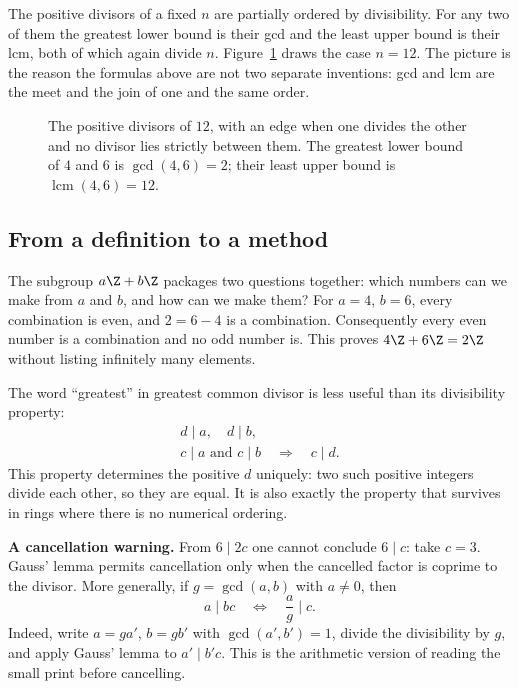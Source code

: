 The positive divisors of a fixed $n$ are partially ordered by divisibility. For any two of them the greatest lower bound is their gcd and the least upper bound is their lcm, both of which again divide $n$. Figure~\ref{fig:divisor-lattice} draws the case $n=12$. The picture is the reason the formulas above are not two separate inventions: gcd and lcm are the meet and the join of one and the same order.

\begin{figure}[ht]
\centering
{}
\caption{The positive divisors of $12$, with an edge when one divides the other and no divisor lies strictly between them. The greatest lower bound of $4$ and $6$ is $\gcd(4,6)=2$; their least upper bound is $\operatorname{lcm}(4,6)=12$.}
\label{fig:divisor-lattice}
\end{figure}

\subsection*{From a definition to a method}
The subgroup $a\Z+b\Z$ packages two questions together: which numbers can we make from $a$ and $b$, and how can we make them? For $a=4$, $b=6$, every combination is even, and $2=6-4$ is a combination. Consequently every even number is a combination and no odd number is. This proves $4\Z+6\Z=2\Z$ without listing infinitely many elements.

The word ``greatest'' in greatest common divisor is less useful than its divisibility property:
\[
\begin{gathered}
d\mid a,\quad d\mid b,\\
c\mid a\text{ and }c\mid b\quad\Longrightarrow\quad c\mid d.
\end{gathered}
\]
This property determines the positive $d$ uniquely: two such positive integers divide each other, so they are equal. It is also exactly the property that survives in rings where there is no numerical ordering.

\textbf{A cancellation warning.} From $6\mid2c$ one cannot conclude $6\mid c$: take $c=3$. Gauss' lemma permits cancellation only when the cancelled factor is coprime to the divisor. More generally, if $g=\gcd(a,b)$ with $a\ne0$, then
\[
a\mid bc\quad\Longleftrightarrow\quad \frac ag\mid c.
\]
Indeed, write $a=ga'$, $b=gb'$ with $\gcd(a',b')=1$, divide the divisibility by $g$, and apply Gauss' lemma to $a'\mid b'c$. This is the arithmetic version of reading the small print before cancelling.

